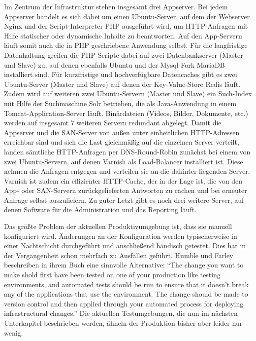 Im Zentrum der Infrastruktur stehen insgesamt drei Appserver. Bei jedem Appserver handelt es sich dabei um einen Ubuntu-Server, auf dem der Webserver Nginx und der Script-Interpreter PHP ausgeführt wird, um HTTP-Anfragen mit Hilfe statischer oder dynamische Inhalte zu beantworten. Auf den App-Servern läuft somit auch die in PHP geschriebene Anwendung selbst. Für die langfristige Datenhaltung greifen die PHP-Scripte dabei auf zwei Datenbankserver (Master und Slave) zu, auf denen ebenfalls Ubuntu und der Mysql-Fork MariaDB installiert sind. Für kurzfristige und hochverfügbare Datencaches gibt es zwei Ubuntu-Server (Master und Slave) auf denen der Key-Value-Store Redis läuft. Zudem wird auf weiteren zwei Ubuntu-Servern (Master und Slave) ein Such-Index mit Hilfe der Suchmaschine Solr betrieben, die als Java-Anwendung in einem Tomcat-Application-Server läuft. Binärdateien (Videos, Bilder, Dokumente, etc.) werden auf insgesamt 7 weiteren Servern redundant abgelegt. Damit die Appserver und die SAN-Server von außen unter einheitlichen HTTP-Adressen erreichbar sind und sich die Last gleichmäßig auf die einzelnen Server verteilt, landen sämtliche HTTP-Anfragen per DNS-Round-Robin zunächst bei einem von zwei Ubuntu-Servern, auf denen Varnish als Load-Balancer installiert ist. Diese nehmen die Anfragen entgegen und verteilen sie an die dahinter liegenden Server. Varnish ist zudem ein effizienter HTTP-Cache, der in der Lage ist, die von den App- oder SAN-Servern zurückgelieferten Antworten zu cachen und bei erneuter Anfrage selbst auszuliefern. Zu guter Letzt gibt es noch drei weitere Server, auf denen Software für die Administration und das Reporting läuft.

Das größte Problem der aktuellen Produktivumgebung ist, dass sie manuell konfiguriert wird. Änderungen an der Konfiguration werden typischerweise in einer Nachtschicht durchgeführt und anschließend händisch getestet. Dies hat in der Vergangenheit schon mehrfach zu Ausfällen geführt. Humble und Farley beschreiben in ihrem Buch eine sinnvolle Alternative: "`The change you want to make shold first have been tested on one of your production like testing environments, and automated tests should be run to ensure that it doesn't break any of the applications that use the environment. The change should be made to version control and then applied through your automated process for deploying infrastructural changes."' \citep[S.][S. 287]{HumFar10} Die aktuellen Testumgebungen, die nun im nächsten Unterkapitel beschrieben werden, ähneln der Produktion bisher aber leider nur wenig.

